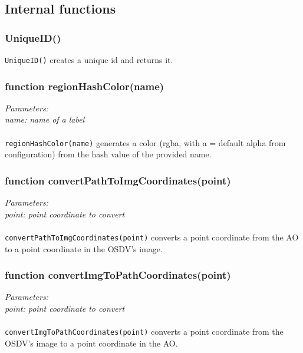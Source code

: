 \subsection{Internal functions}

\subsubsection{UniqueID()}
\texttt{UniqueID()} creates a unique id and returns it.


\subsubsection{function regionHashColor(name)}
\emph{Parameters:\\
	name: name of a label\\ \\
}
\texttt{regionHashColor(name)} generates a color (rgba, with a = default alpha from configuration) from the hash value of the provided name.

\subsubsection{function convertPathToImgCoordinates(point)}
\emph{Parameters:\\
	point: point coordinate to convert\\ \\
}
\texttt{convertPathToImgCoordinates(point)} converts a point coordinate from the AO to a point coordinate in the OSDV's image.


\subsubsection{function convertImgToPathCoordinates(point)}
\emph{Parameters:\\
	point: point coordinate to convert\\ \\
}
\texttt{convertImgToPathCoordinates(point)} converts a point coordinate from the OSDV's image to a point coordinate in the AO.

